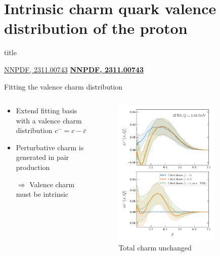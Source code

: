\documentclass[aspectratio=43, 8pt,t]{beamer}
\newcommand{\SectionTitleFrame}[1][]{%
  \begin{frame}
    \vfill
    \centering
    \begin{beamercolorbox}[sep=8pt,center,shadow=true,rounded=true]{title}
      \usebeamerfont{title}\insertsection\par
    \end{beamercolorbox}
    \ifx\relax#1\relax\else
      \vspace{0.5cm}
      \textbf{#1}
    \fi
    \vfill
  \end{frame}
}
\begin{document}
\section*{Intrinsic charm quark valence distribution of the proton}
\SectionTitleFrame[\hyperlink{https://arxiv.org/abs/2311.00743}{NNPDF, 2311.00743}]


\begin{frame}{Fitting the valence charm distribution}
  \begin{columns}
    \begin{column}{0.49\columnwidth}
      \begin{itemize}
        \item Extend fitting basis with a valence charm distribution $c^-=c-\bar{c}$
        \item Perturbative charm is generated in pair production
        \item[$\Rightarrow$] Valence charm must be intrinsic
      \end{itemize}
    \end{column}
    \begin{column}{0.49\columnwidth}
      \begin{figure}
        \includegraphics[width=0.8\textwidth]{CharmAsymmetry-q1p65gev-Fig1Main-noVSR.pdf}
        \caption*{Total charm unchanged}
      \end{figure}
    \end{column}
  \end{columns}
\end{frame}
\end{document}
